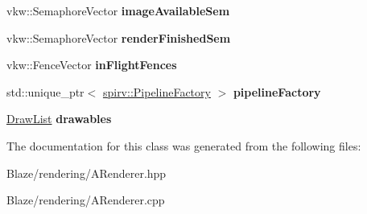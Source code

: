 \begin{DoxyCompactItemize}
\item 
\mbox{\label{classblaze_1_1ARenderer_accaa640496d736ae46f0cc0549b0b59e}} 
vkw\+::\+Semaphore\+Vector {\bfseries image\+Available\+Sem}
\item 
\mbox{\label{classblaze_1_1ARenderer_a351ea8ada814a74953b624e34d91c7a1}} 
vkw\+::\+Semaphore\+Vector {\bfseries render\+Finished\+Sem}
\item 
\mbox{\label{classblaze_1_1ARenderer_ac7a5a6d1ab20ead4d903d4867aa6c81b}} 
vkw\+::\+Fence\+Vector {\bfseries in\+Flight\+Fences}
\item 
\mbox{\label{classblaze_1_1ARenderer_ae5ca0812615c13266803055936c6fdd0}} 
std\+::unique\+\_\+ptr$<$ \hyperlink{classblaze_1_1spirv_1_1PipelineFactory}{spirv\+::\+Pipeline\+Factory} $>$ {\bfseries pipeline\+Factory}
\item 
\mbox{\label{classblaze_1_1ARenderer_a2131f0ab8880d1165fcfa9586b4a32f0}} 
\hyperlink{classblaze_1_1util_1_1PackedHandler}{Draw\+List} {\bfseries drawables}
\end{DoxyCompactItemize}


The documentation for this class was generated from the following files\+:\begin{DoxyCompactItemize}
\item 
Blaze/rendering/A\+Renderer.\+hpp\item 
Blaze/rendering/A\+Renderer.\+cpp\end{DoxyCompactItemize}
